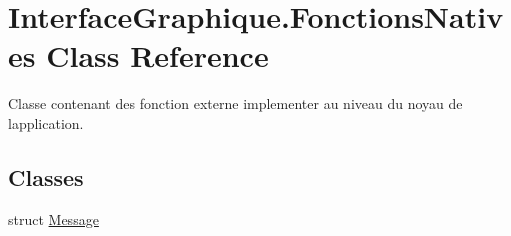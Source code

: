 \hypertarget{class_interface_graphique_1_1_fonctions_natives}{}\section{Interface\+Graphique.\+Fonctions\+Natives Class Reference}
\label{class_interface_graphique_1_1_fonctions_natives}


Classe contenant des fonction externe implementer au niveau du noyau de l\textquotesingle{}application.  


\subsection*{Classes}
\begin{DoxyCompactItemize}
\item 
struct \hyperlink{struct_interface_graphique_1_1_fonctions_natives_1_1_message}{Message}
\end{DoxyCompactItemize}
